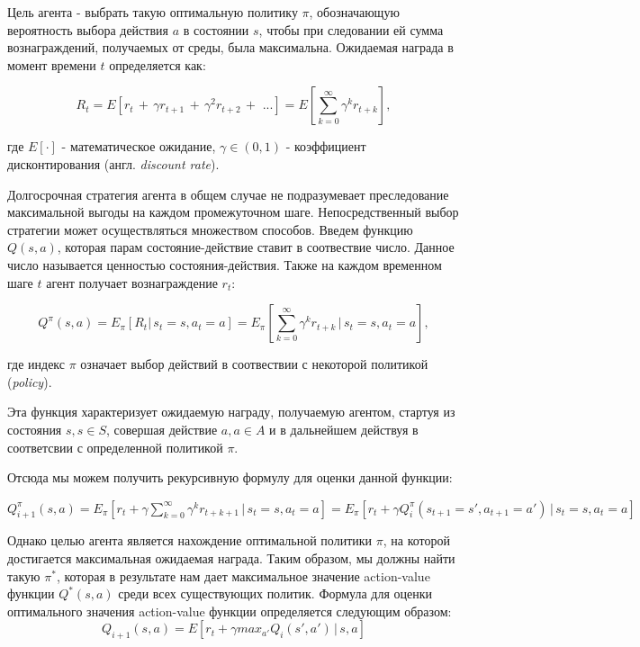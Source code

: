 \documentclass[a4paper]{report}
\theoremstyle{definition}
\theoremstyle{plain}
\theoremstyle{remark}
\theoremstyle{remark}
\theoremstyle{definition}
\begin{document}
Цель агента - выбрать такую оптимальную политику $\pi$, обозначающую вероятность выбора действия $a$ в состоянии $s$, чтобы при следовании ей сумма вознаграждений, получаемых от среды, была максимальна.
Ожидаемая награда в момент времени $t$ определяется как:

$$R_t = E[r_t \,+\, \gamma r_{t+1} \,+\, \gamma^2 r_{t+2}\, +\,\, ...] = E\left[\sum_{k=0}^{\infty}\gamma^kr_{t+k}\right],$$

где $E[\cdot]$ - математическое ожидание, $\gamma\in(0, 1)$ - коэффициент дисконтирования (англ. \textit{discount rate}).

Долгосрочная стратегия агента в общем случае не подразумевает преследование максимальной выгоды на каждом промежуточном шаге. Непосредственный выбор стратегии может осуществляться множеством способов.
Введем функцию $Q(s,a)$, которая парам состояние-действие ставит в соотвествие число. Данное число называется ценностью состояния-действия. Также на каждом временном шаге $ t $ агент получает вознаграждение $ r_{t} $:

$$Q^{\pi}(s, a) = E_{\pi}[R_t|\,s_t=s, a_t=a] = E_{\pi}\left[\sum_{k=0}^{\infty}\gamma^kr_{t+k}\,|\,s_t=s, a_t=a\right],$$

где индекс $\pi$ означает выбор действий в соотвествии с некоторой политикой (\textit{policy}).

Эта функция характеризует ожидаемую награду, получаемую агентом, стартуя из состояния $s, s \in S$, совершая действие $a, a \in A$ и в дальнейшем действуя в соответсвии с определенной политикой $\pi$.

Отсюда мы можем получить рекурсивную формулу для оценки данной функции:\\

\begin{center}
	$Q_{i+1}^{\pi}(s, a) = E_{\pi}\left[r_t + \gamma\sum_{k=0}^{\infty}\gamma^kr_{t+k+1}\,|\,s_t=s, a_t=a\right] = E_{\pi}\left[r_t + \gamma Q_{i}^{\pi}(s_{t+1}=s', a_{t+1}=a')\,|\,s_t=s, a_t=a\right]$
\end{center}

Однако целью агента является нахождение оптимальной политики $\pi$, на которой достигается максимальная ожидаемая награда. Таким образом, мы должны найти такую $\pi^*$, которая в результате нам дает максимальное значение action-value функции $Q^*(s, a)$ среди всех существующих политик. Формула для оценки оптимального значения action-value функции определяется следующим образом:
$$Q_{i+1}(s, a) = E[r_t + \gamma max_{a'}Q_i(s', a')\,|\,s, a]$$
\end{document}
